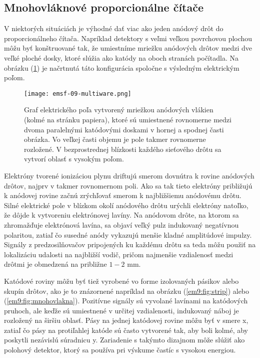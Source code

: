 \documentclass[../../main.tex]{subfiles}
\begin{document}
\subsection{Mnohovláknové proporcionálne čítače}
V niektorých situáciách je výhodné dať viac ako jeden anódový drôt do proporcionálneho čítača. Napríklad detektory s veľmi veľkou povrchovou plochou môžu byť konštruované  tak, že umiestníme mriežku anódových drôtov medzi dve veľké ploché dosky, ktoré slúžia ako katódy na oboch stranách počítadla. Na obrázku (\ref{em9:fig:multiware}) je načrtnutá táto konfigurácia spoločne s výsledným elektrickým poľom.

\begin{figure}[!h]
\texttt{[image: emsf-09-multiware.png]}
\centering
\caption{Graf elektrického poľa vytvorený mriežkou anódových vlákien (kolmé na stránku papiera), ktoré sú umiestnené rovnomerne medzi dvoma paralelnými katódovými doskami v hornej a spodnej časti obrázka. Vo veľkej časti objemu je pole takmer rovnomerne rozložené. V bezprostrednej blízkosti každého sieťového drôtu sa vytvorí oblasť s vysokým poľom.}
\label{em9:fig:multiware}
\end{figure}

Elektróny tvorené ionizáciou plynu driftujú smerom dovnútra k rovine anódových drôtov, najprv v takmer rovnomernom poli. Ako sa tak tieto elektróny približujú k anódovej rovine začnú zrýchľovať smerom k najbližšiemu anódovému drôtu. Silné elektrické pole v blízkom okolí anódového drôtu urýchli elektróny natoľko, že dôjde k vytvoreniu elektrónovej lavíny. Na anódovom drôte, na ktorom sa zhromažďuje elektrónová lavína, sa objaví veľký pulz indukovaný negatívnou polaritou, zatiaľ čo susedné anódy vykazujú menšie kladné amplitúdové impulzy. Signály z predzosilňovačov pripojených ku každému drôtu sa teda môžu použiť na lokalizáciu udalosti na najbližší vodič, pričom najmenšie vzdialenosť medzi drôtmi je obmedzená na približne $1-2$ mm.

Katódové roviny môžu byť tiež vyrobené vo forme izolovaných pásikov alebo skupín drôtov, ako je to znázornené napríklad na obrázku (\ref{em9:fig:strip}) alebo (\ref{em9:fig:mnohovlakna}). Pozitívne signály sú vyvolané lavínami na katódových pruhoch, ale keďže sú umiestnené v určitej vzdialenosti, indukovaný náboj je rozložený na širšiu oblasť. Pásy na jednej katódovej rovine môžu byť v smere x, zatiaľ čo pásy na protiľahlej katóde sú často vytvorené tak, aby boli kolmé, aby poskytli nezávislú súradnicu y. Zariadenie s takýmto dizajnom môže slúžiť ako polohový detektor, ktorý sa používa pri výskume častíc s vysokou energiou.
\end{document}
